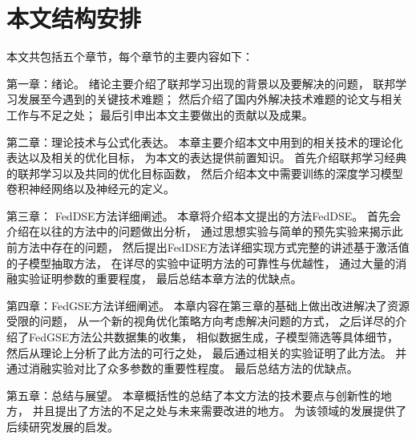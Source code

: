 \section{本文结构安排}
本文共包括五个章节，每个章节的主要内容如下：

第一章：绪论。
绪论主要介绍了联邦学习出现的背景以及要解决的问题，
联邦学习发展至今遇到的关键技术难题；
然后介绍了国内外解决技术难题的论文与相关工作与不足之处；
最后引申出本文主要做出的贡献以及成果。

第二章：理论技术与公式化表达。 
本章主要介绍本文中用到的相关技术的理论化表达以及相关的优化目标，
为本文的表达提供前置知识。
首先介绍联邦学习经典的联邦学习以及共同的优化目标函数，
然后介绍本文中需要训练的深度学习模型卷积神经网络以及神经元的定义。

第三章： FedDSE方法详细阐述。
本章将介绍本文提出的方法FedDSE。
首先会介绍在以往的方法中的问题做出分析，
通过思想实验与简单的预先实验来揭示此前方法中存在的问题，
然后提出FedDSE方法详细实现方式完整的讲述基于激活值的子模型抽取方法，
在详尽的实验中证明方法的可靠性与优越性，
通过大量的消融实验证明参数的重要程度，
最后总结本章方法的优缺点。

第四章：FedGSE方法详细阐述。
本章内容在第三章的基础上做出改进解决了资源受限的问题，
从一个新的视角优化策略方向考虑解决问题的方式，
之后详尽的介绍了FedGSE方法公共数据集的收集，
相似数据生成，子模型筛选等具体细节，
然后从理论上分析了此方法的可行之处，
最后通过相关的实验证明了此方法。
并通过消融实验对比了众多参数的重要性程度。
最后总结方法的优缺点。

第五章：总结与展望。
本章概括性的总结了本文方法的技术要点与创新性的地方，
并且提出了方法的不足之处与未来需要改进的地方。
为该领域的发展提供了后续研究发展的启发。